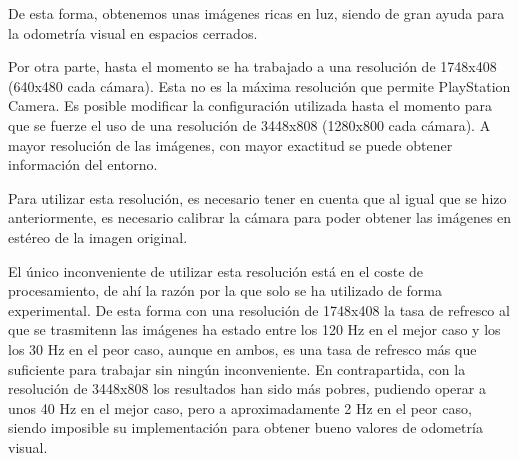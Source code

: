 De esta forma, obtenemos unas imágenes ricas en luz, siendo de gran ayuda para
la odometría visual en espacios cerrados.

Por otra parte, hasta el momento se ha trabajado a una resolución de 1748x408
(640x480 cada cámara). Esta no es la máxima resolución que permite PlayStation
Camera. Es posible modificar la configuración utilizada hasta el momento para
que se fuerze el uso de una resolución de 3448x808 (1280x800 cada cámara). A
mayor resolución de las imágenes, con mayor exactitud se puede obtener
información del entorno.

Para utilizar esta resolución, es necesario tener en cuenta que al igual que se
hizo anteriormente, es necesario calibrar la cámara para poder obtener las
imágenes en estéreo de la imagen original.

El único inconveniente de utilizar esta resolución está en el coste de
procesamiento, de ahí la razón por la que solo se ha utilizado de forma
experimental. De esta forma con una resolución de 1748x408 la tasa de refresco
al que se trasmitenn las imágenes ha estado entre los 120 Hz en el mejor caso y
los los 30 Hz en el peor caso, aunque en ambos, es una tasa de refresco más que
suficiente para trabajar sin ningún inconveniente. En contrapartida, con la
resolución de 3448x808 los resultados han sido más pobres, pudiendo operar a
unos 40 Hz en el mejor caso, pero a aproximadamente 2 Hz en el peor caso, siendo
imposible su implementación para obtener bueno valores de odometría visual.



















